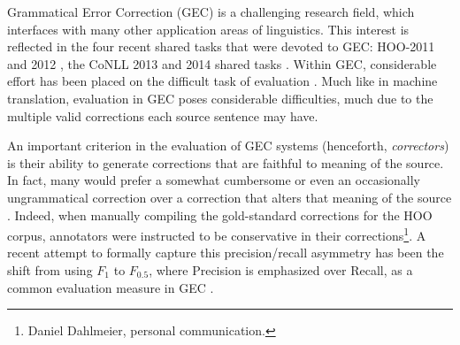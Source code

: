 \documentclass[english]{article}
\begin{document}



Grammatical Error Correction (GEC) is a challenging research field, which interfaces with many
other application areas of linguistics. This interest is reflected in the four recent shared
tasks that were devoted to GEC: HOO-2011 and 2012 \cite{dale2011helping,dale2012hoo},
the CoNLL 2013 and 2014 shared tasks \cite{kao2013conll,ng2014conll}.
Within GEC, considerable effort has been placed on the difficult task of
evaluation \cite{tetreault2008native,madnani2011they,chodorow2012problems,dahlmeier2012better}.
Much like in machine translation, evaluation in GEC poses considerable difficulties, much
due to the multiple valid corrections each source sentence may have.

An important criterion in the evaluation of GEC systems (henceforth, {\it correctors})
is their ability to
generate corrections that are faithful to meaning of the source. In fact, many would prefer
a somewhat cumbersome or even an occasionally ungrammatical correction over a correction
that alters that meaning of the source \citet{brockett2006correcting}.
Indeed, when manually compiling the gold-standard corrections for the HOO corpus, annotators
were instructed to be conservative in their corrections\footnote{Daniel Dahlmeier,
  personal communication.}.
A recent attempt to formally capture this precision/recall asymmetry has been the shift from
using $F_1$ to $F_{0.5}$, where Precision is emphasized over Recall, as a common evaluation
measure in GEC \cite{dahlmeier2012better}.
\end{document}
